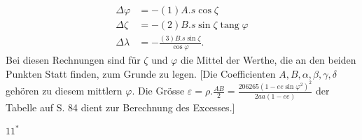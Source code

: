 \[
\begin{aligned}
\Delta\varphi&=-(1)A.s\cos\zeta\\
\Delta\zeta&=-(2)B.s\sin\zeta\operatorname{tang}\varphi\\
\Delta\lambda&=-\frac{(3)B.s\sin\zeta}{\cos\varphi}.
\end{aligned}
\]
Bei diesen Rechnungen sind für \(\zeta\) und \(\varphi\) die Mittel der Werthe, die an
den beiden Punkten Statt finden, zum Grunde zu legen. [Die Coefficienten
\(A,B,\alpha,\beta,\gamma,\delta\) gehören zu diesem mittlern \(\varphi\). Die Grösse
\(\varepsilon=\rho.\frac{AB}{2}=\frac{206265(1-ee\sin\varphi^2)^2}{2aa(1-ee)}\)
der Tabelle auf S. 84 dient zur Berechnung des Excesses.]
\par\smallskip\noindent\hfill\(11^*\)\hspace{.12\textwidth}\par

